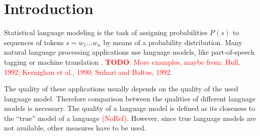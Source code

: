 \documentclass[11pt,a4paper]{article}
\title{\mytitle}
\author{
  \myname \\
  \small{\myaddress} \\
  \small{\texttt{\href{mailto:\mymail}{\nolinkurl{\mymail}}}}
}
\date{\today}
\newcommand{\probSymbol}[1][]{P_{#1}}
\newcommand{\prob}[2][]{\probSymbol[#1](#2)}
\newcommand{\todo}[1]{\textcolor{red}{\textbf{TODO}: #1}}
\newcommand{\noref}{\textcolor{red}{(NoRef)}}
\begin{document}
\maketitle

\begin{abstract}
  The quality of a language model is commonly measured with the entropy of its
  probability distribution.
  However it is not clear whether language models that score better entropy
  actually perform better in a given application.
  Applications' usage of language models can usually be represented as an
  argmax query.
  However argmax computation is a very time intensive operation, and therefore
  no practicable measure of language model quality.
  This thesis will research how to efficiently compute argmax queries and
  thus be able to present a measure of quality that is closer to actual
  applications.
  It will then explore how this measure compares to entropy.
\end{abstract}

\section{Introduction}

Statistical language modeling is the task of assigning probabilities $\prob{s}$
to sequences of tokens ${s = w_1 \ldots w_n}$ by means of a
probability distribution.
Many natural language processing applications use language models, like
part-of-speech tagging or machine translation \parencite{Church1988,Brown1990}.
\todo{More examples, maybe from: Hull, 1992; Kernighan et al., 1990;
Srihari and Baltus, 1992.}

The quality of these applications usually depends on the quality of the used
language model.
Therefore comparison between the qualities of different language models is
necessary.
The quality of a language model is defined as its closeness to the ``true''
model of a language \noref.
However, since true language models are not available, other measures have to be
used.
\end{document}
